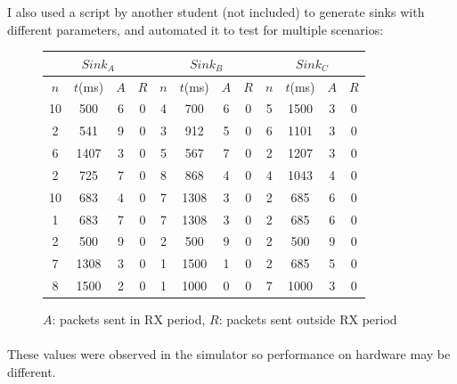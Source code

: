 \documentclass{article}
\begin{document}
I also used a script by another student (not included) to generate sinks with different parameters,
and automated it to test for multiple scenarios:

\begin{figure}
\begin{tabular}{|c|c|c|c||c|c|c|c||c|c|c|c|}
  \hline 
  \multicolumn{4}{|c||}{$Sink_{A}$} & \multicolumn{4}{c||}{$Sink_{B}$} & \multicolumn{4}{c|}{$Sink_{C}$}\tabularnewline
  \hline 
  $n$ & $t$(ms) & $A$ & $R$ & $n$ & $t$(ms) & $A$ & $R$ & $n$ & $t$(ms) & $A$ & $R$\tabularnewline
  \hline 
  \hline 
  10 & 500 & 6 & 0 & 4 & 700 & 6 & 0 & 5 & 1500 & 3 & 0\tabularnewline
  \hline 
  2 & 541 & 9 & 0 & 3 & 912 & 5 & 0 & 6 & 1101 & 3 & 0\tabularnewline
  \hline 
  6 & 1407 & 3 & 0 & 5 & 567 & 7 & 0 & 2 & 1207 & 3 & 0\tabularnewline
  \hline 
  2 & 725 & 7 & 0 & 8 & 868 & 4 & 0 & 4 & 1043 & 4 & 0\tabularnewline
  \hline 
  10 & 683 & 4 & 0 & 7 & 1308 & 3 & 0 & 2 & 685 & 6 & 0\tabularnewline
  \hline 
  1 & 683 & 7 & 0 & 7 & 1308 & 3 & 0 & 2 & 685 & 6 & 0\tabularnewline
  \hline 
  2 & 500 & 9 & 0 & 2 & 500 & 9 & 0 & 2 & 500 & 9 & 0\tabularnewline
  \hline 
  7 & 1308 & 3 & 0 & 1 & 1500 & 1 & 0 & 2 & 685 & 5 & 0\tabularnewline
  \hline 
  8 & 1500 & 2 & 0 & 1 & 1000 & 0 & 0 & 7 & 1000 & 3 & 0\tabularnewline
  \hline 
\end{tabular}
\caption{$A$: packets sent in RX period, $R$: packets sent outside RX period}
\end{figure}
\paragraph{}

These values were observed in the simulator so performance on hardware may be different.\

\paragraph{}


\end{document}
